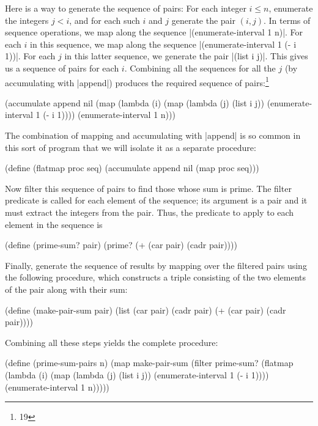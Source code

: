 \begin{Exercise}
Here is a way to generate the sequence of pairs: For each integer $i
\le n$, enumerate the integers $j < i$, and for each such $i$ and $j$
generate the pair $(i,j)$.  In terms of sequence operations, we map
along the sequence \scheme|(enumerate-interval 1 n)|.  For each $i$ in
this sequence, we map along the sequence \scheme|(enumerate-interval 1
(- i 1))|.  For each $j$ in this latter sequence, we generate the pair
\scheme|(list i j)|.  This gives us a sequence of pairs for each $i$.
Combining all the sequences for all the $j$ (by accumulating with
\scheme|append|) produces the required sequence of pairs:\footnote{19}
\begin{schemedisplay}
(accumulate append
            nil
            (map (lambda (i)
                   (map (lambda (j) (list i j))
                        (enumerate-interval 1 (- i 1))))
                 (enumerate-interval 1 n)))
\end{schemedisplay}
The combination of mapping and accumulating with \scheme|append| is so
common in this sort of program that we will isolate it as a separate
procedure:
\begin{schemedisplay}
(define (flatmap proc seq)
  (accumulate append nil (map proc seq)))
\end{schemedisplay}
Now filter this sequence of pairs to find those whose sum is
prime. The filter predicate is called for each element of the
sequence; its argument is a pair and it must extract the integers from
the pair.  Thus, the predicate to apply to each element in the
sequence is
\begin{schemedisplay}
(define (prime-sum? pair)
  (prime? (+ (car pair) (cadr pair))))
\end{schemedisplay}
Finally, generate the sequence of results by mapping over the filtered
pairs using the following procedure, which constructs a triple
consisting of the two elements of the pair along with their sum:
\begin{schemedisplay}
(define (make-pair-sum pair)
  (list (car pair) (cadr pair) (+ (car pair) (cadr pair))))
\end{schemedisplay}
Combining all these steps yields the complete procedure:
\begin{schemedisplay}
(define (prime-sum-pairs n)
  (map make-pair-sum
       (filter prime-sum?
               (flatmap
                (lambda (i)
                  (map (lambda (j) (list i j))
                       (enumerate-interval 1 (- i 1))))
                (enumerate-interval 1 n)))))
\end{schemedisplay}


\end{Exercise}
